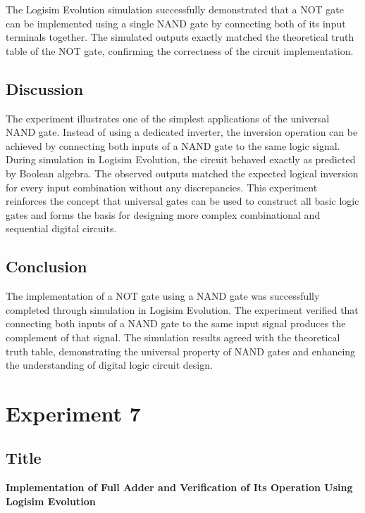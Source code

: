 \documentclass[12pt,a4paper]{article}
\begin{document}
The Logisim Evolution simulation successfully demonstrated that a NOT gate can be implemented using a single NAND gate by connecting both of its input terminals together. The simulated outputs exactly matched the theoretical truth table of the NOT gate, confirming the correctness of the circuit implementation.

\subsection{Discussion}

The experiment illustrates one of the simplest applications of the universal NAND gate. Instead of using a dedicated inverter, the inversion operation can be achieved by connecting both inputs of a NAND gate to the same logic signal. During simulation in Logisim Evolution, the circuit behaved exactly as predicted by Boolean algebra. The observed outputs matched the expected logical inversion for every input combination without any discrepancies. This experiment reinforces the concept that universal gates can be used to construct all basic logic gates and forms the basis for designing more complex combinational and sequential digital circuits.

\subsection{Conclusion}

The implementation of a NOT gate using a NAND gate was successfully completed through simulation in Logisim Evolution. The experiment verified that connecting both inputs of a NAND gate to the same input signal produces the complement of that signal. The simulation results agreed with the theoretical truth table, demonstrating the universal property of NAND gates and enhancing the understanding of digital logic circuit design.



\section{Experiment 7}
\subsection{Title}
\textbf{Implementation of Full Adder and Verification of Its Operation Using Logisim Evolution}
\end{document}
